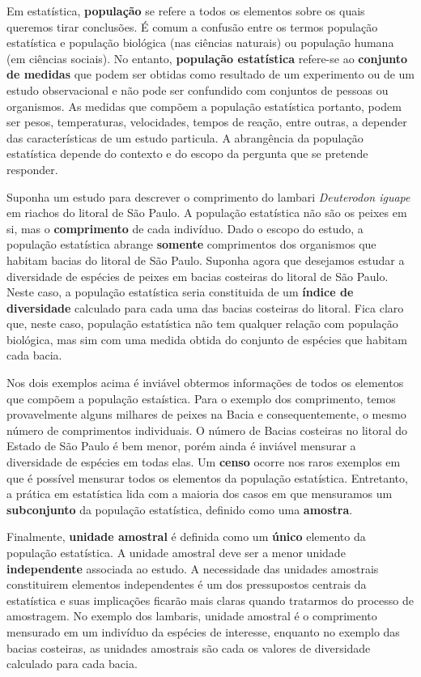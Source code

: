 \documentclass[
]{book}
\begin{document}
Em estatística, \textbf{população} se refere a todos os elementos sobre os quais queremos tirar conclusões. É comum a confusão entre os termos população estatística e população biológica (nas ciências naturais) ou população humana (em ciências sociais). No entanto, \textbf{população estatística} refere-se ao \textbf{conjunto de medidas} que podem ser obtidas como resultado de um experimento ou de um estudo observacional e não pode ser confundido com conjuntos de pessoas ou organismos. As medidas que compõem a população estatística portanto, podem ser pesos, temperaturas, velocidades, tempos de reação, entre outras, a depender das características de um estudo particula. A abrangência da população estatística depende do contexto e do escopo da pergunta que se pretende responder.

Suponha um estudo para descrever o comprimento do lambari \emph{Deuterodon iguape} em riachos do litoral de São Paulo. A população estatística não são os peixes em si, mas o \textbf{comprimento} de cada indivíduo. Dado o escopo do estudo, a população estatística abrange \textbf{somente} comprimentos dos organismos que habitam bacias do litoral de São Paulo. Suponha agora que desejamos estudar a diversidade de espécies de peixes em bacias costeiras do litoral de São Paulo. Neste caso, a população estatística seria constituida de um \textbf{índice de diversidade} calculado para cada uma das bacias costeiras do litoral. Fica claro que, neste caso, população estatística não tem qualquer relação com população biológica, mas sim com uma medida obtida do conjunto de espécies que habitam cada bacia.

Nos dois exemplos acima é inviável obtermos informações de todos os elementos que compõem a população estaística. Para o exemplo dos comprimento, temos provavelmente alguns milhares de peixes na Bacia e consequentemente, o mesmo número de comprimentos individuais. O número de Bacias costeiras no litoral do Estado de São Paulo é bem menor, porém ainda é inviável mensurar a diversidade de espécies em todas elas. Um \textbf{censo} ocorre nos raros exemplos em que é possível mensurar todos os elementos da população estatística. Entretanto, a prática em estatística lida com a maioria dos casos em que mensuramos um \textbf{subconjunto} da população estatística, definido como uma \textbf{amostra}.

Finalmente, \textbf{unidade amostral} é definida como um \textbf{único} elemento da população estatística. A unidade amostral deve ser a menor unidade \textbf{independente} associada ao estudo. A necessidade das unidades amostrais constituirem elementos independentes é um dos pressupostos centrais da estatística e suas implicações ficarão mais claras quando tratarmos do processo de amostragem. No exemplo dos lambaris, unidade amostral é o comprimento mensurado em um indivíduo da espécies de interesse, enquanto no exemplo das bacias costeiras, as unidades amostrais são cada os valores de diversidade calculado para cada bacia.
\end{document}
